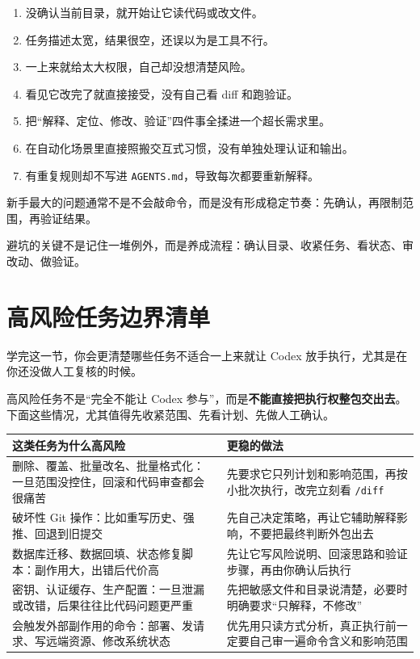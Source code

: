 \documentclass[UTF8,a4paper,12pt]{ctexart}
\begin{document}
\begin{enumerate}
  \item 没确认当前目录，就开始让它读代码或改文件。
  \item 任务描述太宽，结果很空，还误以为是工具不行。
  \item 一上来就给太大权限，自己却没想清楚风险。
  \item 看见它改完了就直接接受，没有自己看 diff 和跑验证。
  \item 把“解释、定位、修改、验证”四件事全揉进一个超长需求里。
  \item 在自动化场景里直接照搬交互式习惯，没有单独处理认证和输出。
  \item 有重复规则却不写进 \texttt{AGENTS.md}，导致每次都要重新解释。
\end{enumerate}

\begin{warnbox}
新手最大的问题通常不是不会敲命令，而是没有形成稳定节奏：先确认，再限制范围，再验证结果。
\end{warnbox}

\begin{sumbox}
避坑的关键不是记住一堆例外，而是养成流程：确认目录、收紧任务、看状态、审改动、做验证。
\end{sumbox}

\section{高风险任务边界清单}

\begin{learnbox}
学完这一节，你会更清楚哪些任务不适合一上来就让 Codex 放手执行，尤其是在你还没做人工复核的时候。
\end{learnbox}

高风险任务不是“完全不能让 Codex 参与”，而是\textbf{不能直接把执行权整包交出去}。下面这些情况，尤其值得先收紧范围、先看计划、先做人工确认。

\begin{longtable}{>{\raggedright\arraybackslash}p{} >{\raggedright\arraybackslash}p{}}
\toprule
这类任务为什么高风险 & 更稳的做法 \\
\midrule
\endhead
删除、覆盖、批量改名、批量格式化：一旦范围没控住，回滚和代码审查都会很痛苦 & 先要求它只列计划和影响范围，再按小批次执行，改完立刻看 \texttt{/diff} \\
破坏性 Git 操作：比如重写历史、强推、回退到旧提交 & 先自己决定策略，再让它辅助解释影响，不要把最终判断外包出去 \\
数据库迁移、数据回填、状态修复脚本：副作用大，出错后代价高 & 先让它写风险说明、回滚思路和验证步骤，再由你确认后执行 \\
密钥、认证缓存、生产配置：一旦泄漏或改错，后果往往比代码问题更严重 & 先把敏感文件和目录说清楚，必要时明确要求“只解释，不修改” \\
会触发外部副作用的命令：部署、发请求、写远端资源、修改系统状态 & 优先用只读方式分析，真正执行前一定要自己审一遍命令含义和影响范围 \\
\bottomrule
\end{longtable}
\end{document}
